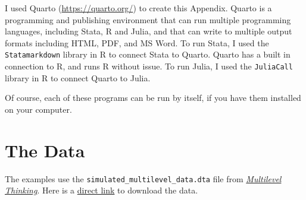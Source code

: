 \documentclass[
  letterpaper,
  DIV=11,
  numbers=noendperiod]{scrreprt}
\begin{document}
\begin{tcolorbox}[enhanced jigsaw, bottomtitle=1mm, opacitybacktitle=0.6, title=\textcolor{quarto-callout-tip-color}{\faLightbulb}\hspace{0.5em}{Running Statistical Packages in Quarto}, opacityback=0, titlerule=0mm, toprule=.15mm, breakable, colframe=quarto-callout-tip-color-frame, rightrule=.15mm, coltitle=black, colback=white, toptitle=1mm, arc=.35mm, left=2mm, leftrule=.75mm, bottomrule=.15mm, colbacktitle=quarto-callout-tip-color!10!white]

I used Quarto (\url{https://quarto.org/}) to create this Appendix.
Quarto is a programming and publishing environment that can run multiple
programming languages, including Stata, R and Julia, and that can write
to multiple output formats including HTML, PDF, and MS Word. To run
Stata, I used the \texttt{Statamarkdown} library in R to connect Stata
to Quarto. Quarto has a built in connection to R, and runs R without
issue. To run Julia, I used the \texttt{JuliaCall} library in R to
connect Quarto to Julia.

Of course, each of these programs can be run by itself, if you have them
installed on your computer.

\end{tcolorbox}

\section{The Data}\label{sec-data}

The examples use the \texttt{simulated\_multilevel\_data.dta} file from
\href{https://agrogan1.github.io/multilevel-thinking/simulated-multi-country-data.html}{\emph{Multilevel
Thinking}}. Here is a
\href{https://github.com/agrogan1/multilevel-multilingual/raw/main/simulated_multilevel_data.dta}{direct
link} to download the data.
\end{document}
